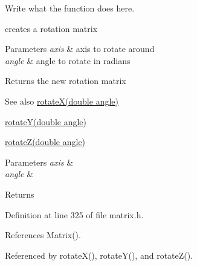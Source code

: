 Write what the function does here. 

creates a rotation matrix


\begin{DoxyParams}{Parameters}
{\em axis} & axis to rotate around \\
\hline
{\em angle} & angle to rotate in radians \\
\hline
\end{DoxyParams}
\begin{DoxyReturn}{Returns}
the new rotation matrix 
\end{DoxyReturn}
\begin{DoxySeeAlso}{See also}
\hyperlink{classMatrix_abc63d4009ae96f03ad44545e9d1c3c81}{rotate\+X(double angle)} 

\hyperlink{classMatrix_a83ee280c509de4ff036d26e8ed11d52f}{rotate\+Y(double angle)} 

\hyperlink{classMatrix_a1b0199d040686543579e52695eb6da14}{rotate\+Z(double angle)} 
\end{DoxySeeAlso}

\begin{DoxyParams}{Parameters}
{\em axis} & \\
\hline
{\em angle} & \\
\hline
\end{DoxyParams}
\begin{DoxyReturn}{Returns}

\end{DoxyReturn}


Definition at line 325 of file matrix.\+h.



References Matrix().



Referenced by rotate\+X(), rotate\+Y(), and rotate\+Z().


